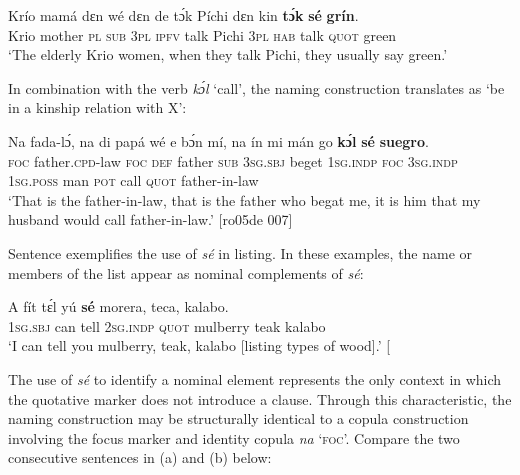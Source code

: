 \ea%
    \label{ex:key:1376}
    \gll Krío  mamá  dɛn  wé  dɛn  de  tɔ́k  Píchi  dɛn  kin  \textbf{tɔ́k}  \textbf{sé}    \textbf{grín}.\\
Krio  mother  \textsc{pl}  \textsc{sub}  \textsc{3pl}  \textsc{ipfv}  talk  Pichi  \textsc{3pl}  \textsc{hab}  talk \textsc{quot}    green\\

\glt ‘The elderly Krio women, when they talk Pichi, they usually say green.’ 
\z

In combination with the verb \textit{kɔ́l} ‘call’, the naming construction translates as ‘be in a kinship relation with X’:


\ea%
    \label{ex:key:1377}
    \gll Na  fada-lɔ́,      na  di  papá  wé  e    bɔ́n    mí,    na  ín  
mi    mán    go  \textbf{kɔ́l}  \textbf{sé}    \textbf{suegro}.\\
\textsc{foc}  father.\textsc{cpd}{}-law  \textsc{foc}  \textsc{def}  father  \textsc{sub}  \textsc{3sg.sbj}  beget  \textsc{1sg.indp}  \textsc{foc}  \textsc{3sg.indp}  
\textsc{1sg.poss}  man    \textsc{pot}  call  \textsc{quot}    father-in-law\\

\glt ‘That is the father-in-law, that is the father who begat me, it is him that my 
husband would call father-in-law.’ [ro05de 007]
\z

Sentence  exemplifies the use of \textit{sé} in listing. In these examples, the name or members of the list appear as nominal complements of \textit{sé}: 


\ea%
    \label{ex:key:1378}
    \gll A    fít  tɛ́l  yú    \textbf{sé}    morera,    teca,  kalabo.\\
\textsc{1sg.sbj}  can  tell  \textsc{2sg.indp}  \textsc{quot}    mulberry  teak    kalabo\\

\glt ‘I can tell you mulberry, teak, kalabo [listing types of wood].’ [\textstylePichiexamplenumberZchnZchn{ro05de 051]}
\z

The use of \textit{sé} to identify a nominal element represents the only context in which the quotative marker does not introduce a clause. Through this characteristic, the naming construction may be structurally identical to a copula construction involving the focus marker and identity copula \textit{na} ‘\textsc{foc}’. Compare the two consecutive sentences in (a) and (b) below: 


